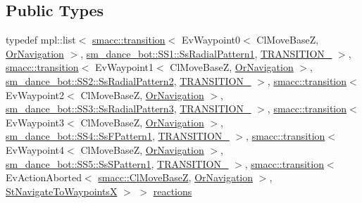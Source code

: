 \subsection*{Public Types}
\begin{DoxyCompactItemize}
\item 
typedef mpl\+::list$<$ \hyperlink{classsmacc_1_1transition}{smacc\+::transition}$<$ Ev\+Waypoint0$<$ Cl\+Move\+BaseZ, \hyperlink{classsm__dance__bot_1_1OrNavigation}{Or\+Navigation} $>$, \hyperlink{structsm__dance__bot_1_1SS1_1_1SsRadialPattern1}{sm\+\_\+dance\+\_\+bot\+::\+S\+S1\+::\+Ss\+Radial\+Pattern1}, \hyperlink{structsm__dance__bot_1_1StNavigateToWaypointsX_1_1TRANSITION__1}{T\+R\+A\+N\+S\+I\+T\+I\+O\+N\+\_} $>$, \hyperlink{classsmacc_1_1transition}{smacc\+::transition}$<$ Ev\+Waypoint1$<$ Cl\+Move\+BaseZ, \hyperlink{classsm__dance__bot_1_1OrNavigation}{Or\+Navigation} $>$, \hyperlink{structsm__dance__bot_1_1SS2_1_1SsRadialPattern2}{sm\+\_\+dance\+\_\+bot\+::\+S\+S2\+::\+Ss\+Radial\+Pattern2}, \hyperlink{structsm__dance__bot_1_1StNavigateToWaypointsX_1_1TRANSITION__2}{T\+R\+A\+N\+S\+I\+T\+I\+O\+N\+\_} $>$, \hyperlink{classsmacc_1_1transition}{smacc\+::transition}$<$ Ev\+Waypoint2$<$ Cl\+Move\+BaseZ, \hyperlink{classsm__dance__bot_1_1OrNavigation}{Or\+Navigation} $>$, \hyperlink{structsm__dance__bot_1_1SS3_1_1SsRadialPattern3}{sm\+\_\+dance\+\_\+bot\+::\+S\+S3\+::\+Ss\+Radial\+Pattern3}, \hyperlink{structsm__dance__bot_1_1StNavigateToWaypointsX_1_1TRANSITION__3}{T\+R\+A\+N\+S\+I\+T\+I\+O\+N\+\_} $>$, \hyperlink{classsmacc_1_1transition}{smacc\+::transition}$<$ Ev\+Waypoint3$<$ Cl\+Move\+BaseZ, \hyperlink{classsm__dance__bot_1_1OrNavigation}{Or\+Navigation} $>$, \hyperlink{structsm__dance__bot_1_1SS4_1_1SsFPattern1}{sm\+\_\+dance\+\_\+bot\+::\+S\+S4\+::\+Ss\+F\+Pattern1}, \hyperlink{structsm__dance__bot_1_1StNavigateToWaypointsX_1_1TRANSITION__4}{T\+R\+A\+N\+S\+I\+T\+I\+O\+N\+\_} $>$, \hyperlink{classsmacc_1_1transition}{smacc\+::transition}$<$ Ev\+Waypoint4$<$ Cl\+Move\+BaseZ, \hyperlink{classsm__dance__bot_1_1OrNavigation}{Or\+Navigation} $>$, \hyperlink{structsm__dance__bot_1_1SS5_1_1SsSPattern1}{sm\+\_\+dance\+\_\+bot\+::\+S\+S5\+::\+Ss\+S\+Pattern1}, \hyperlink{structsm__dance__bot_1_1StNavigateToWaypointsX_1_1TRANSITION__5}{T\+R\+A\+N\+S\+I\+T\+I\+O\+N\+\_} $>$, \hyperlink{classsmacc_1_1transition}{smacc\+::transition}$<$ Ev\+Action\+Aborted$<$ \hyperlink{classsmacc_1_1ClMoveBaseZ}{smacc\+::\+Cl\+Move\+BaseZ}, \hyperlink{classsm__dance__bot_1_1OrNavigation}{Or\+Navigation} $>$, \hyperlink{structsm__dance__bot_1_1StNavigateToWaypointsX}{St\+Navigate\+To\+WaypointsX} $>$ $>$ \hyperlink{structsm__dance__bot_1_1StNavigateToWaypointsX_af39e27baae658e0ea8085eb3a04e67f5}{reactions}
\end{DoxyCompactItemize}
